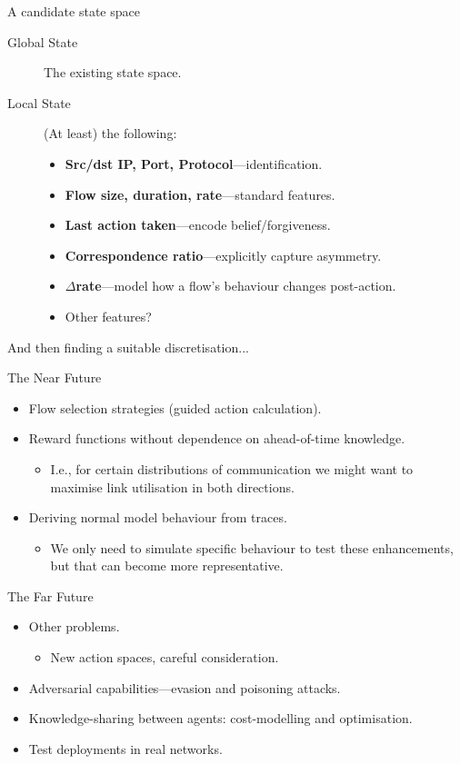 \documentclass[aspectratio=169,xcolor={dvipsnames}
,hide notes
]{beamer}
\begin{document}
\begin{frame}{A candidate state space}
\begin{description}
	\item[Global State] The existing state space.
	\item[Local State] (At least) the following:
	\begin{itemize}
		\item \textbf{Src/dst IP, Port, Protocol}---identification.
		\item \textbf{Flow size, duration, rate}---standard features.
		\item \textbf{\alert{Last action taken}}---encode belief/forgiveness.
		\item \textbf{\alert{Correspondence ratio}}---explicitly capture asymmetry.
		\item \textbf{\alert{$\Delta$rate}}---model how a flow's behaviour changes post-action.
		\item Other features?
	\end{itemize}
\end{description}

And then finding a suitable discretisation...
\end{frame}

\begin{frame}{The Near Future}
\begin{itemize}
	\item Flow selection strategies (guided action calculation).
	\item Reward functions without dependence on ahead-of-time knowledge.
	\begin{itemize}
		\item I.e., for certain distributions of communication we might want to maximise link utilisation in both directions.
	\end{itemize}

\item Deriving normal model behaviour from traces.
\begin{itemize}
	\item We only need to simulate specific behaviour to test these enhancements, but that can become more representative.
\end{itemize}
\end{itemize}
\end{frame}

\begin{frame}{The Far Future}
\begin{itemize}
	\item Other problems.
	\begin{itemize}
		\item New action spaces, careful consideration.
	\end{itemize}
\item Adversarial capabilities---evasion and poisoning attacks.
\item Knowledge-sharing between agents: cost-modelling and optimisation.
\item Test deployments in real networks.
\end{itemize}
\end{frame}
\end{document}
